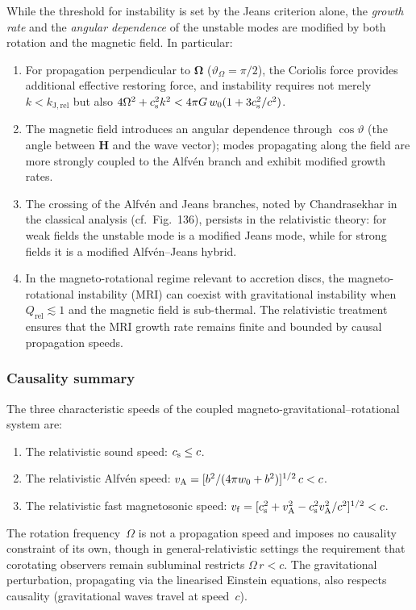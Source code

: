 While the threshold for instability is set by the Jeans criterion alone,
the \emph{growth rate} and the \emph{angular dependence} of the unstable
modes are modified by both rotation and the magnetic field.  In
particular:
\begin{enumerate}
\item[(i)] For propagation perpendicular to $\boldsymbol{\Omega}$
  ($\vartheta_{\Omega}=\pi/2$), the Coriolis force provides additional
  effective restoring force, and instability requires not merely
  $k < k_{\mathrm{J,rel}}$ but also
  $4\Omega^{2} + c_{\mathrm{s}}^{2}k^{2}
  < 4\pi G\,w_{0}(1+3c_{\mathrm{s}}^{2}/c^{2})$.
\item[(ii)] The magnetic field introduces an angular dependence through
  $\cos\vartheta$ (the angle between $\mathbf{H}$ and the wave
  vector); modes propagating along the field are more strongly
  coupled to the Alfv\'en branch and exhibit modified growth rates.
\item[(iii)] The crossing of the Alfv\'en and Jeans branches, noted by
  Chandrasekhar in the classical analysis (cf.\ Fig.~136), persists in
  the relativistic theory: for weak fields the unstable mode is a
  modified Jeans mode, while for strong fields it is a modified
  Alfv\'en--Jeans hybrid.
\item[(iv)] In the magneto-rotational regime relevant to accretion
  discs, the magneto-rotational instability (MRI) can coexist with
  gravitational instability when $Q_{\mathrm{rel}} \lesssim 1$ and the
  magnetic field is sub-thermal.  The relativistic treatment ensures that
  the MRI growth rate remains finite and bounded by causal propagation
  speeds.
\end{enumerate}

\subsubsection*{Causality summary}

The three characteristic speeds of the coupled magneto-gravitational--rotational
system are:
\begin{enumerate}
\item The relativistic sound speed: $c_{\mathrm{s}} \le c$.
\item The relativistic Alfv\'en speed:
  $v_{\mathrm{A}} = [b^{2}/(4\pi w_{0}+b^{2})]^{1/2}\,c < c$.
\item The relativistic fast magnetosonic speed:
  $v_{\mathrm{f}} = [c_{\mathrm{s}}^{2}+v_{\mathrm{A}}^{2}-c_{\mathrm{s}}^{2}v_{\mathrm{A}}^{2}/c^{2}]^{1/2} < c$.
\end{enumerate}
The rotation frequency~$\Omega$ is not a propagation speed and imposes
no causality constraint of its own, though in general-relativistic
settings the requirement that corotating observers remain subluminal
restricts $\Omega\,r < c$.  The gravitational perturbation, propagating
via the linearised Einstein equations, also respects causality
(gravitational waves travel at speed~$c$).

